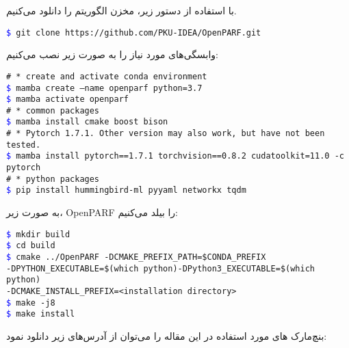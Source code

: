 
با استفاده از دستور زیر، مخزن الگوریتم را دانلود می‌کنیم.
\begin{latin}
	\texttt{\textcolor{blue}{\$} git clone https://github.com/PKU-IDEA/OpenPARF.git}
\end{latin}


وابسگی‌های مورد نیاز را به صورت زیر نصب می‌کنیم:
\begin{latin}
	\texttt{\# * create and activate conda environment}\\
	\texttt{\textcolor{blue}{\$} mamba create --name openparf python=3.7}\\
	\texttt{\textcolor{blue}{\$} mamba activate openparf}\\
	\texttt{\# * common packages}\\
	\texttt{\textcolor{blue}{\$} mamba install cmake boost bison}\\
	\texttt{\# * Pytorch 1.7.1. Other version may also work, but have not been tested.}\\
	\texttt{\textcolor{blue}{\$} mamba install pytorch==1.7.1 torchvision==0.8.2 cudatoolkit=11.0 -c pytorch}\\
	\texttt{\# * python packages}\\
	\texttt{\textcolor{blue}{\$} pip install hummingbird-ml pyyaml networkx tqdm}\\
\end{latin}

به صورت زیر، OpenPARF را بیلد می‌کنیم:
\begin{latin}
	\texttt{\textcolor{blue}{\$} mkdir build}\\
	\texttt{\textcolor{blue}{\$} cd build}\\
	\texttt{\textcolor{blue}{\$} cmake ../OpenPARF -DCMAKE\_PREFIX\_PATH=\$CONDA\_PREFIX}\\
	\texttt{-DPYTHON\_EXECUTABLE=\$(which python)-DPython3\_EXECUTABLE=\$(which python)}\\
	\texttt{-DCMAKE\_INSTALL\_PREFIX=<installation directory>}\\
	\texttt{\textcolor{blue}{\$} make -j8}\\
	\texttt{\textcolor{blue}{\$} make install}\\
\end{latin}

بنچ‌مارک های مورد استفاده در این مقاله را می‌توان از آدرس‌های زیر دانلود نمود:

